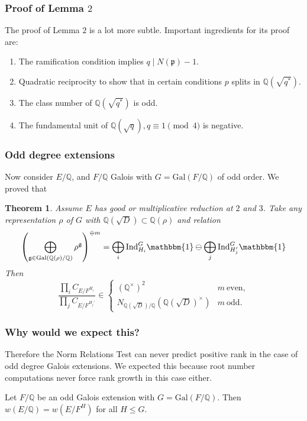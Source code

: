 \documentclass{beamer}
\newcommand{\Gal}{\mathrm{Gal}}
\newcommand{\rk}{\mathrm{rk}}
\newcommand{\Ind}{\mathrm{Ind}}
\newcommand{\QQ}{\mathbb{Q}}
\newcommand{\pp}{\mathfrak{p}}
\newcommand{\bQ}{\mathbb{Q}}
\theoremstyle{plain}
\newtheorem{thm}{Theorem}[section]
\begin{document}
\begin{frame}
    \frametitle{Proof of Lemma $2$}
    The proof of Lemma $2$ is a lot more subtle. Important ingredients for its proof are:
    \begin{enumerate}
        \item The ramification condition implies $q\mid N(\pp)-1$.
        \item Quadratic reciprocity to show that in certain conditions $p$ splits in $\QQ(\sqrt{q^*})$.
        \item The class number of $\QQ(\sqrt{q^*})$ is odd.
        \item The fundamental unit of $\QQ(\sqrt{q}), q\equiv1\pmod{4}$ is negative.
    \end{enumerate}
\end{frame}

\begin{frame}
    \frametitle{Odd degree extensions}
    Now consider $E / \bQ$, and $F / \bQ$ Galois with $G = \Gal(F / \bQ)$ of odd order. \pause
    We proved that
    {\begin{thm}\label{odd-exts}
       Assume $E$ has good or multiplicative reduction at $2$ and $3$. 
       Take any representation $\rho$ of $G$ with $\bQ(\sqrt{D}) \subset \bQ(\rho)$ and relation
       \begin{equation*}\label{odd-exp}
        \left(\bigoplus_{\mathfrak{g}\in\Gal(\QQ(\rho)/\QQ)}\rho^{\mathfrak{g}}\right)^{\oplus m }=\bigoplus_i\Ind_{H_i}^G\mathbbm{1}\ominus\bigoplus_j\Ind_{H_j'}^G\mathbbm{1}
       \end{equation*}
         Then
        \[ \frac{\prod_i C_{E/F^{H_i}}}{\prod_j C_{E/F^{H_j'}}}  \in 
           \begin{cases} 
            (\bQ^{\times})^2 & m \ \text{even},\\
               N_{\bQ(\sqrt{D}) / \bQ}(\bQ(\sqrt{D})^{\times}) & m \ \text{odd}.
           \end{cases} \] 
       \end{thm}}
\end{frame}

\begin{frame}
    \frametitle{Why would we expect this?}
        Therefore the Norm Relations Test can never predict positive rank in the case of odd degree Galois extensions. \pause We expected this because root number computations never force rank growth in this case either. \pause
        \begin{lemma}\label{lem_oddroot}
            Let $F / \bQ$ be an odd Galois extension with $G = \Gal(F / \bQ)$. Then $w(E / \bQ) = w(E / F^H)$ for all $H \leq G$. 
        \end{lemma}

\end{frame}
\end{document}
